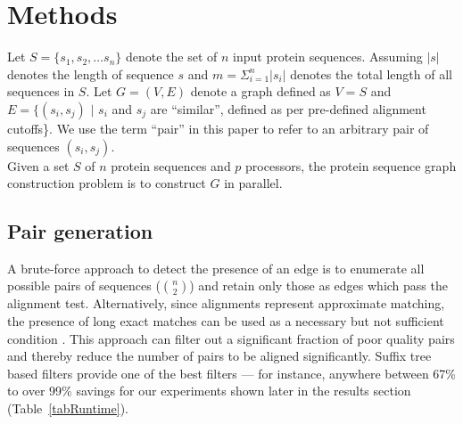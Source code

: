 \documentclass[10pt,journal,letterpaper,compsoc]{IEEEtran}
\begin{document}
\section{Methods}
\label{secMethods}

 Let $S=\{s_1,s_2,\ldots s_n\}$ denote the set of $n$ input protein sequences. Assuming $|s|$ denotes the length of sequence $s$ and $m=\Sigma_{i=1}^n |s_i|$ denotes the total length of all sequences in $S$. Let $G=(V,E)$ denote a graph defined as $V=S$ and $E=\{(s_i,s_j)$ $|$ $s_i$ and $s_j$ are ``similar'', defined as per pre-defined alignment cutoffs\}. We use the term ``pair'' in this paper to refer to an arbitrary pair of sequences $(s_i,s_j)$. \\

 Given a set $S$ of $n$ protein sequences and $p$ processors, the protein sequence graph construction problem is to construct $G$ in parallel.\\




\subsection{Pair generation}
\label{secGeneratingPairs}

A brute-force approach to detect the presence of an edge is to enumerate all possible  pairs of sequences ($n\choose 2$) and retain only those as edges which pass the alignment test. Alternatively, since alignments represent approximate matching, the presence of long exact matches can be used as a necessary but not sufficient condition \cite{KalyanaramanJPDC07}. This approach can filter out a significant fraction of poor quality pairs and thereby reduce the number of pairs to be aligned significantly. Suffix tree based filters provide one of the best filters --- for instance, anywhere between 67\% to over 99\% savings for our experiments shown later in the results section (Table~\ref{tabRuntime}). 
\end{document}
